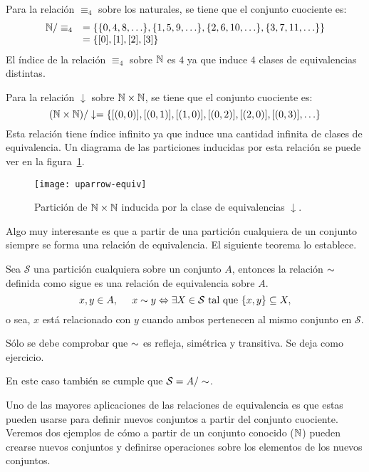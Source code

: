 \begin{ejemplo}
Para la relación $\equiv_4$ sobre los naturales, se tiene que el conjunto cuociente es:
\[
\begin{array}{rl}
\mathbb{N}/\equiv_4&=\{\{0,4,8,\ldots\},\{1,5,9,\ldots\},\{2,6,10,\ldots\},\{3,7,11,\ldots\}\} \\
&=\{[0],[1],[2],[3]\}
\end{array}
\]
El índice de la relación $\equiv_4$ sobre $\mathbb{N}$ es $4$ ya que induce $4$ clases de equivalencias distintas.

Para la relación $\downarrow$ sobre $\mathbb{N}\times\mathbb{N}$, se tiene que el conjunto cuociente es:
\[
(\mathbb{N}\times\mathbb{N})/\downarrow=\{[(0,0)],[(0,1)],[(1,0)],[(0,2)],[(2,0)],[(0,3)],\ldots\}
\]
Esta relación tiene índice infinito ya que induce una cantidad infinita de clases de equivalencia.
Un diagrama de las particiones inducidas por esta relación se puede ver en la figura~\ref{fig:uparrow-equiv}.
\begin{figure}[h!]
\centering
\texttt{[image: uparrow-equiv]}
\caption{Partición de $\mathbb{N}\times\mathbb{N}$ inducida por la clase de equivalencias $\downarrow$.}
\label{fig:uparrow-equiv}
\end{figure}
\end{ejemplo}

Algo muy interesante es que a partir de una partición cualquiera de un conjunto siempre se forma una relación de equivalencia.
El siguiente teorema lo establece.

\begin{teorema}
Sea $\mathcal S$ una partición cualquiera sobre un conjunto $A$, entonces la relación $\sim$ definida como sigue es una relación de equivalencia sobre $A$.
\[
x,y\in A,\;\;\;\;\; x\sim y\Leftrightarrow \exists X\in\mathcal S\text{ tal que }\{x,y\}\subseteq X,
\]
o sea, $x$ está relacionado con $y$ cuando ambos pertenecen al mismo conjunto en $\mathcal S$.

\begin{demostracion}
Sólo se debe comprobar que $\sim$ es refleja, simétrica y transitiva.
Se deja como ejercicio.
\end{demostracion}

En este caso también se cumple que $\mathcal S=A/\sim$.
\end{teorema}

Uno de las mayores aplicaciones de las relaciones de equivalencia es que estas pueden usarse para definir nuevos conjuntos a partir del conjunto cuociente.
Veremos dos ejemplos de cómo a partir de un conjunto conocido ($\mathbb{N}$) pueden crearse nuevos conjuntos y definirse operaciones sobre los elementos de los nuevos conjuntos.

